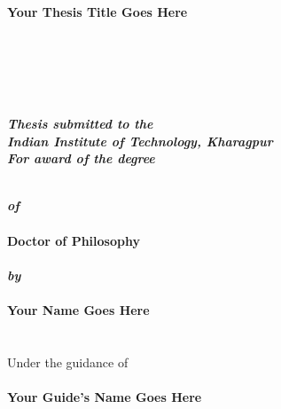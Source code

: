 \thispagestyle{empty}
\vspace{-15mm}
\begin{center}
	\begin{Spacing}{1.5}
    \textbf{\Large Your Thesis Title Goes Here} \\
   	\end{Spacing}
	\hspace{0pt plus 1filll} \\
	\hspace{0pt plus 1filll} \\
	\hspace{0pt plus 1filll} \\
	\hspace{0pt plus 1filll} \\
	\begin{Spacing}{1.4}
    \textbf{\emph{ Thesis submitted to the}} \\ 
   	\textbf{\emph{ Indian Institute of Technology, Kharagpur}}\\
   	\textbf{\emph{ For award of the degree}}\\
   	\end{Spacing}
	\hspace{0pt plus 1filll} \\
    \textbf{ \emph{of}}\\
	\hspace{0pt plus 1filll} \\
    \textbf{ Doctor of Philosophy}\\
	\hspace{0pt plus 1filll} \\
    \textbf{\emph{ by}}\\
	\hspace{0pt plus 1filll} \\
    \textbf{ Your Name Goes Here}\\
	\hspace{0pt plus 1filll} \\
	\hspace{0pt plus 1filll} \\
    { Under the guidance of}\\
	\hspace{0pt plus 1filll} \\
    \textbf{ Your Guide's Name Goes Here} 
    \begin{figure}[h]
    \centering

\end{figure}
\end{center}
